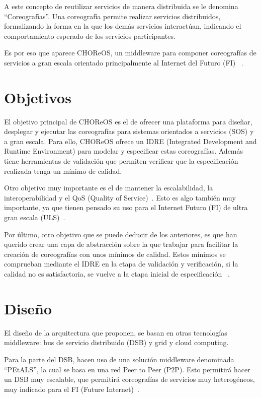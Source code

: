 \documentclass[runningheads]{llncs}
\begin{document}
A este concepto de reutilizar servicios de manera distribuida se le denomina ``Coreografías''. Una coreografía permite realizar servicios distribuidos, formalizando la forma en la que los demás servicios interactúan, indicando el comportamiento esperado de los servicios participantes.

Es por eso que aparece CHOReOS, un middleware para componer coreografías de servicios a gran escala orientado principalmente al Internet del Futuro (FI) ~\cite{a_1}.

\section{Objetivos}
El objetivo principal de CHOReOS es el de ofrecer una plataforma para diseñar, desplegar y ejecutar las coreografías para sistemas orientados a servicios (SOS) y a gran escala. Para ello, CHOReOS ofrece un IDRE (Integrated Development and Runtime Environment) para modelar y especificar estas coreografías. Además tiene herramientas de validación que permiten verificar que la especificación realizada tenga un mínimo de calidad. ~\cite{a_2}

Otro objetivo muy importante es el de mantener la escalabilidad, la interoperabilidad y el QoS (Quality of Service)~\cite{a_3}. Esto es algo también muy importante, ya que tienen pensado su uso para el Internet Futuro (FI) de ultra gran escala (ULS)~\cite{a_2}.

Por último, otro objetivo que se puede deducir de los anteriores, es que han querido crear una capa de abstracción sobre la que trabajar para facilitar la creación de coreografías con unos mínimos de calidad. Estos mínimos se comprueban mediante el IDRE en la etapa de validación y verificación, si la calidad no es satisfactoria, se vuelve a la etapa inicial de especificación ~\cite{a_2}.

\section{Diseño}
El diseño de la arquitectura que proponen, se basan en otras tecnologías middleware: bus de servicio distribuido (DSB) y grid y cloud computing.~\cite{a_1}

Para la parte del DSB, hacen uso de una solución middleware denominada ``PEtALS'', la cual se basa en una red Peer to Peer (P2P). Esto permitirá hacer un DSB muy escalable, que permitirá coreografías de servicios muy heterogéneos, muy indicado para el FI (Future Internet)~\cite{a_1}.
\end{document}
